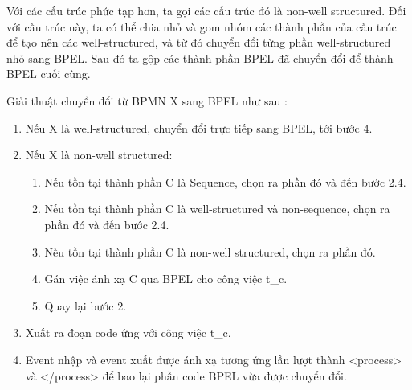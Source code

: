 \par Với các cấu trúc phức tạp hơn, ta gọi các cấu trúc đó là non-well structured. Đối với cấu trúc này, ta có thể chia nhỏ và gom nhóm các thành phần của cấu trúc để tạo nên các well-structured, và từ đó chuyển đổi từng phần well-structured nhỏ sang BPEL.
Sau đó ta gộp các thành phần BPEL đã chuyển đổi để thành BPEL cuối cùng.

\par Giải thuật chuyển đổi từ BPMN X sang BPEL như sau \cite{theoryConvert}:
\begin{enumerate}
    \item Nếu X là well-structured, chuyển đổi trực tiếp sang BPEL, tới bước 4.
    \item Nếu X là non-well structured:
          \begin{enumerate}
              \item Nếu tồn tại thành phần C là Sequence, chọn ra phần đó và đến bước 2.4.
              \item Nếu tồn tại thành phần C là well-structured và non-sequence, chọn ra phần đó và đến bước 2.4.
              \item Nếu tồn tại thành phần C là non-well structured, chọn ra phần đó.
              \item Gán việc ánh xạ C qua BPEL cho công việc t\_{c}.
              \item Quay lại bước 2.
          \end{enumerate}
    \item Xuất ra đoạn code ứng với công việc t\_{c}.
    \item Event nhập và event xuất được ánh xạ tương ứng lần lượt thành <process> và </process> để bao lại phần code BPEL vừa được chuyển đổi.
\end{enumerate}